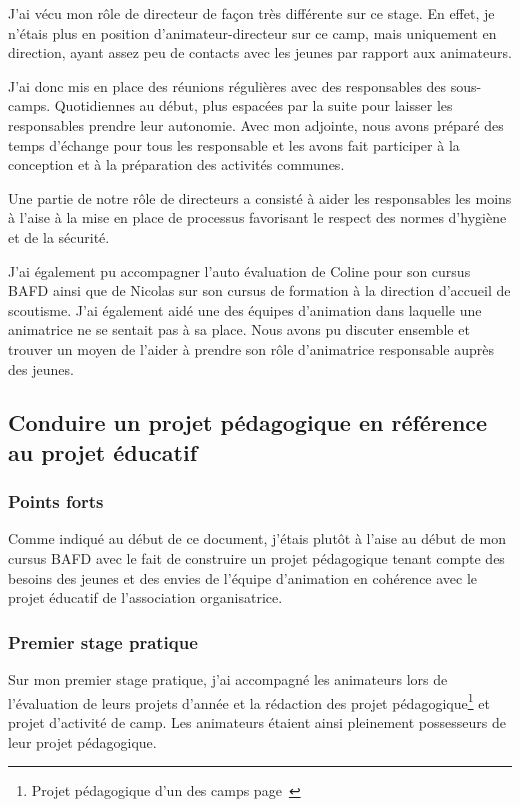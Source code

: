 \documentclass[titlepage,11pt,a4paper]{article}
\begin{document}
J'ai vécu mon rôle de directeur de façon très différente sur ce stage. En effet,
je n'étais plus en position d’animateur-directeur sur ce camp, mais uniquement en
direction, ayant assez peu de contacts avec les jeunes par rapport aux animateurs.

J'ai donc mis en place des réunions régulières avec des responsables des sous-camps.
Quotidiennes au début, plus espacées par la suite pour laisser les responsables prendre leur autonomie.
Avec mon adjointe, nous avons préparé des temps d'échange pour tous les responsable et les
avons fait participer à la conception et à la préparation des activités communes.

Une partie de notre rôle de directeurs a consisté à aider les responsables les moins à l'aise à
la mise en place de processus favorisant le respect des normes d'hygiène et de la sécurité.

J'ai également pu accompagner l'auto évaluation de Coline pour son cursus BAFD ainsi que
de Nicolas sur son cursus de formation à la direction d'accueil de scoutisme. J'ai
également aidé une des équipes d'animation dans laquelle une animatrice ne se
sentait pas à sa place. Nous avons pu discuter ensemble et trouver un moyen de l'aider à
prendre son rôle d'animatrice responsable auprès des jeunes.

\subsection{Conduire un projet pédagogique en référence au projet éducatif}

\subsubsection{Points forts}

Comme indiqué au début de ce document, j'étais plutôt à l'aise au début de mon cursus BAFD
avec le fait de construire un projet pédagogique tenant compte des besoins des jeunes et des
envies de l'équipe d'animation en cohérence avec le projet éducatif de l'association
organisatrice.

\subsubsection{Premier stage pratique}

Sur mon premier stage pratique, j'ai accompagné les animateurs lors de l'évaluation de
leurs projets d'année et la rédaction des projet pédagogique\footnote{Projet pédagogique
d'un des camps page~\pageref{projetpedmarins}} et projet d'activité de
camp. Les animateurs étaient ainsi pleinement possesseurs de leur projet pédagogique.
\end{document}
